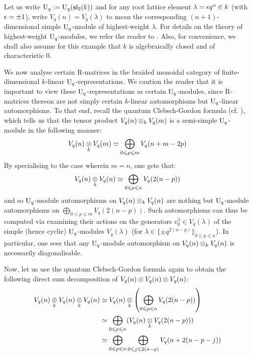         \begin{example}
            Let us write $\mathrm{U}_q := \mathrm{U}_q(\mathfrak{sl}_2(k))$ and for any root lattice element $\lambda = \epsilon q^n\in k$ (with $\epsilon = \pm 1$), write $V_q(n) = V_q(\lambda)$ to mean the corresponding $(n + 1)$-dimensional simple $\mathrm{U}_q$-module of highest-weight $\lambda$. For details on the theory of highest-weight $\mathrm{U}_q$-modules, we refer the reader to \cite[Chapters VI and VII]{kassel_quantum_groups}. Also, for convenience, we shall also assume for this example that $k$ is algebraically closed and of characteristic $0$. 
            
            We now analyse certain R-matrices in the braided monoidal category of finite-dimensional $k$-linear $\mathrm{U}_q$-representations. We caution the reader that it is important to view these $\mathrm{U}_q$-representations as certain $\mathrm{U}_q$-modules, since R-matrices thereon are not simply certain $k$-linear automorphisms but $\mathrm{U}_q$-linear automorphisms. To that end, recall the quantum Clebsch-Gordon formula (cf. \cite[Theorem VII.7.1]{kassel_quantum_groups}), which tells us that the tensor product $V_q(n) \tensor_k V_q(m)$ is a semi-simple $\mathrm{U}_q$-module in the following manner:
                $$V_q(n) \tensor_k V_q(m) \cong \bigoplus_{0 \leq p \leq m} V_q(n + m - 2p)$$
            By specialising to the case wherein $m = n$, one gets that:
                $$V_q(n) \tensor_k V_q(n) \cong \bigoplus_{0 \leq p \leq n} V_q(2(n - p))$$
            and so $\mathrm{U}_q$-module automorphisms on $V_q(n) \tensor_k V_q(n)$ are nothing but $\mathrm{U}_q$-module automorphisms on $\bigoplus_{0 \leq p \leq m} V_q(2(n - p))$. Such automorphisms can thus be computed via examining their actions on the generators $v^{\lambda}_0 \in V_q(\lambda)$ of the simple (hence cyclic) $\mathrm{U}_q$-modules $V_q(\lambda)$ (for $\lambda \in \{\pm q^{ 2(n - p) }\}_{0 \leq p \leq n}$). In particular, one sees that any $\mathrm{U}_q$-module automorphism on $V_q(n) \tensor_k V_q(n)$ is necessarily diagonalisable. 
            
            Now, let us use the quantum Clebsch-Gordon formula again to obtain the following direct sum decomposition of $V_q(n) \tensor V_q(n) \tensor V_q(n)$:
                $$
                    \begin{aligned}
                        V_q(n) \tensor_k V_q(n) \tensor_k V_q(n) & \cong V_q(n) \tensor_k \left( \bigoplus_{0 \leq p \leq n} V_q(2(n - p)) \right)
                        \\
                        & \cong \bigoplus_{0 \leq p \leq n} ( V_q(n) \tensor_k V_q(2(n - p)) )
                        \\
                        & \cong \bigoplus_{0 \leq p \leq n} \bigoplus_{0 \leq j \leq 2(n - p)} V_q(n + 2(n - p - j))
                    \end{aligned}
                $$
        \end{example}
        
